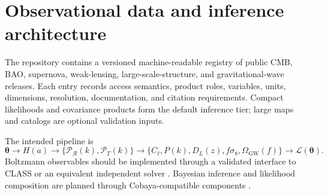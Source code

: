 \section{Observational data and inference architecture}
\label{sec:data}

The repository contains a versioned machine-readable registry of public CMB, BAO, supernova, weak-lensing, large-scale-structure, and gravitational-wave releases. Each entry records access semantics, product roles, variables, units, dimensions, resolution, documentation, and citation requirements. Compact likelihoods and covariance products form the default inference tier; large maps and catalogs are optional validation inputs.

The intended pipeline is
\begin{equation}
\bm\theta\rightarrow H(a)\rightarrow
\{\mathcal{P}_{\mathcal R}(k),\mathcal{P}_T(k)\}
\rightarrow\{C_\ell,P(k),D_L(z),f\sigma_8,\Omega_{\mathrm{GW}}(f)\}
\rightarrow\mathcal{L}(\bm\theta).
\end{equation}
Boltzmann observables should be implemented through a validated interface to CLASS or an equivalent independent solver \citep{blas2011class}. Bayesian inference and likelihood composition are planned through Cobaya-compatible components \citep{torrado2021cobaya}.
